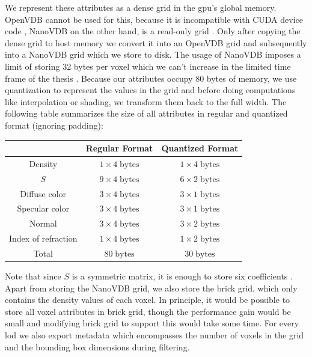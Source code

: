 We represent these attributes as a dense grid in the \acs{gpu}'s global memory.
OpenVDB cannot be used for this, because it is incompatible with CUDA device code \cite{museth_nanovdb}, NanoVDB on the other hand, is a read-only grid \cite{nanovdb}.
Only after copying the dense grid to host memory we convert it into an OpenVDB grid and subsequently into a NanoVDB grid which we store to disk.
The usage of NanoVDB imposes a limit of storing 32 bytes per voxel which we can't increase in the limited time frame of the thesis \cite{open_to_nanovdb}.
Because our attributes occupy 80 bytes of memory, we use quantization to represent the values in the grid and before doing computations like interpolation or shading, we transform them back to the full width.
The following table summarizes the size of all attributes in regular and quantized format (ignoring padding):
\begin{center}
    \begin{tabular}{| c | c | c | }
        \hline
         & Regular Format & Quantized Format \\
         \hline
         Density & $1\times 4\;\text{bytes}$ & $1\times 4\;\text{bytes}$ \\
         \hline
         $S$ & $9\times 4\;\text{bytes}$ & $6\times 2\;\text{bytes}$ \\
         \hline
         Diffuse color & $3\times 4\;\text{bytes}$ & $3\times 1\;\text{bytes}$ \\
         \hline
         Specular color & $3\times 4\;\text{bytes}$ & $3\times 1\;\text{bytes}$ \\
         \hline
         Normal & $3\times 4\;\text{bytes}$ & $3\times 2\;\text{bytes}$ \\
         \hline
         Index of refraction & $1\times 4\;\text{bytes}$ & $1\times 2\;\text{bytes}$ \\
         \thickhline
         Total & $80\;\text{bytes}$ & $30\;\text{bytes}$ \\
         \hline
    \end{tabular}
\end{center}
Note that since $S$ is a symmetric matrix, it is enough to store six coefficients \cite{sggx}.
Apart from storing the NanoVDB grid, we also store the brick grid, which only contains the density values of each voxel.
In principle, it would be possible to store all voxel attributes in brick grid, though the performance gain would be small and modifying brick grid to support this would take some time.
For every \ac{lod} we also export metadata which encompasses the number of voxels in the grid and the bounding box dimensions during filtering.

